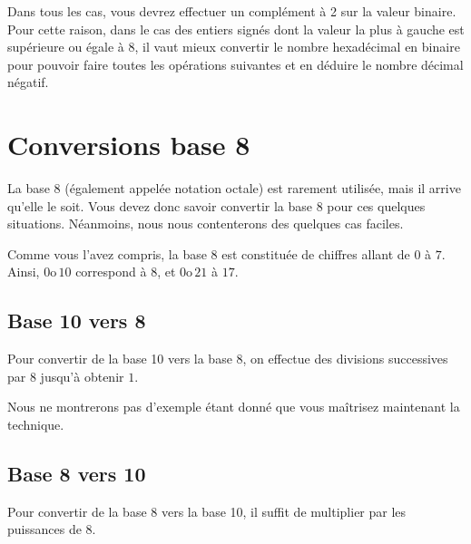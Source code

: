 \documentclass[11pt,a4paper]{article}
\begin{document}
Dans tous les cas, vous devrez effectuer un complément à 2 sur la valeur binaire.
Pour cette raison, dans le cas des entiers signés dont la valeur la plus à gauche est supérieure ou égale à 8, il vaut mieux convertir le nombre hexadécimal en binaire pour pouvoir faire toutes les opérations suivantes et en déduire le nombre décimal négatif.

\bigskip



\section{Conversions base 8}

\bigskip

La base 8 (également appelée notation octale) est rarement utilisée, mais il arrive qu'elle le soit.
Vous devez donc savoir convertir la base 8 pour ces quelques situations.
Néanmoins, nous nous contenterons des quelques cas faciles.

\medskip

Comme vous l'avez compris, la base 8 est constituée de chiffres allant de $ 0 $ à $ 7 $.
Ainsi, $ 0\text{o} \, 10 $ correspond à $ 8 $, et $ 0\text{o} \, 21 $ à $ 17 $.

\bigskip


\subsection{Base 10 vers 8}

\bigskip

Pour convertir de la base 10 vers la base 8, on effectue des divisions successives par $ 8 $ jusqu'à obtenir $ 1 $.

Nous ne montrerons pas d'exemple étant donné que vous maîtrisez maintenant la technique.

\bigskip


\subsection{Base 8 vers 10}

\bigskip

Pour convertir de la base 8 vers la base 10, il suffit de multiplier par les puissances de 8.

\bigskip
\end{document}
